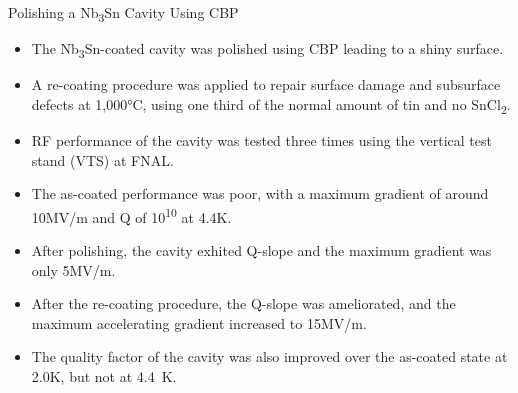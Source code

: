 \documentclass{beamer}
\begin{document}
\begin{frame}{}
\begin{columns}[t]
\begin{column}{0.32\textwidth}
\begin{block}{\label{sec:cavitycbp}Polishing a Nb\textsubscript{3}Sn Cavity Using CBP}
                    \begin{itemize}
                        \item The Nb\textsubscript{3}Sn-coated cavity was polished using CBP leading to a shiny surface.
                        \item A re-coating procedure was applied to repair surface damage and subsurface defects at 1,000°C, using one third of the normal amount of tin and no SnCl\textsubscript{2}.
                        \item RF performance of the cavity was tested three times using the vertical test stand (VTS) at FNAL.
                        \item The as-coated performance was poor, with a maximum gradient of around 10MV/m and Q of 10\textsuperscript{10} at 4.4K.
                        \item After polishing, the cavity exhited Q-slope and the maximum gradient was only 5MV/m.
                        \item After the re-coating procedure, the Q-slope was ameliorated, and the maximum accelerating gradient increased to 15MV/m.
                        \item The quality factor of the cavity was also improved over the as-coated state at 2.0K, but not at 4.4~K.
                    \end{itemize}
                \end{block}
            \end{column}
        \end{columns}
    \end{frame}
\end{document}
